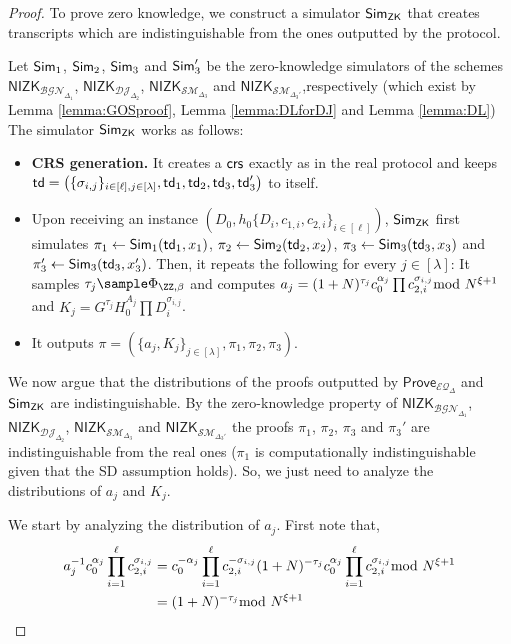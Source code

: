 \begin{proof}
To prove zero knowledge, we construct a simulator $\mathsf{Sim}_\mathsf{ZK}$ that creates transcripts which are indistinguishable from the ones outputted by the protocol.

Let $\mathsf{Sim}_1$, $\mathsf{Sim}_2$, $\mathsf{Sim}_3$ and $\mathsf{Sim}_3'$ be the zero-knowledge simulators of the schemes $\mathsf{NIZK}_{\mathcal{BGN}_{\Delta_1}}$, $\mathsf{NIZK}_{\mathcal{DJ}_{\Delta_2}}$, $\mathsf{NIZK}_{\mathcal{SM}_{\Delta_3}}$ and $\mathsf{NIZK}_{\mathcal{SM}_{\Delta_3'}}$,respectively (which exist by Lemma \ref{lemma:GOSproof}, Lemma \ref{lemma:DLforDJ} and Lemma \ref{lemma:DL}) The simulator $\mathsf{Sim}_\mathsf{ZK}$ works as follows:
\begin{itemize}
    \item \textbf{CRS generation.} It creates a $\mathsf{crs}$ exactly as in the real protocol and keeps $\mathsf{td}=\left(\{\sigma_{i,j}\}_{{i}\in[\ell],j\in [\lambda]},\mathsf{td}_1,\mathsf{td}_2,\mathsf{td}_3,\mathsf{td}_3'\right)$ to itself.
    \item Upon receiving an instance $(D_0,h_0\{D_i,c_{1,i},c_{2,i}\}_{i\in [\ell]})$, $\mathsf{Sim}_\mathsf{ZK}$ first simulates $\pi_1\leftarrow\mathsf{Sim}_1(\mathsf{td}_1,x_1)$, $\pi_2\leftarrow\mathsf{Sim}_2(\mathsf{td}_2,x_2)$, $\pi_3\leftarrow\mathsf{Sim}_3(\mathsf{td}_3,x_3)$ and $\pi_3'\leftarrow\mathsf{Sim}_3(\mathsf{td}_3,x'_3)$. Then, it repeats the following for every $j\in [\lambda]$: It samples $\tau_{j}\sample \Phi_{\ZZ,\beta}$ and computes $a_{j}=(1+N)^{\tau_{j}}c_0^{\alpha_j} \prod c_{2,i}^{\sigma_{i,j}}\!\!\!\!\mod N^{\xi+1}$ and $K_j=G^{\tau_{j}}H_0^{A_j}\prod D_i^{\sigma_{i,j}}$.
    \item It outputs $\pi=(\{a_{j},K_j\}_{j\in [\lambda]},\pi_1,\pi_2,\pi_3)$.
\end{itemize}
We now argue that the distributions of the proofs outputted by $\mathsf{Prove}_{\mathcal{EQ}_\Delta}$ and $\mathsf{Sim}_\mathsf{ZK}$ are indistinguishable. By the zero-knowledge property of $\mathsf{NIZK}_{\mathcal{BGN}_{\Delta_1}}$, $\mathsf{NIZK}_{\mathcal{DJ}_{\Delta_2}}$, $\mathsf{NIZK}_{\mathcal{SM}_{\Delta_3}}$ and $\mathsf{NIZK}_{\mathcal{SM}_{\Delta_3'}}$ the proofs $\pi_1$, $\pi_2$, $\pi_3$ and $\pi_3'$ are indistinguishable from the real ones ($\pi_1$ is computationally indistinguishable given that the SD assumption holds). So, we just need to analyze the distributions of $a_{j}$ and $K_j$.


We start by analyzing the distribution of $a_{j}$. First note that, \begin{align*}
    a_{j}^{-1}c_0^{\alpha_j}\prod_{i=1}^\ell c_{2,i}^{\sigma_{i,j}}& =c_0^{-\alpha_j}\prod_{i=1}^\ell c_{2,i}^{-\sigma_{i,j}}(1+N)^{-\tau_{j}} c_0^{\alpha_j} \prod_{i=1}^\ell  c_{2,i}^{\sigma_{i,j}} \smod N^{\xi+1}\\ 
     & = (1+N)^{-\tau_{j}}\smod N^{\xi+1}
\end{align*}



\end{proof}
